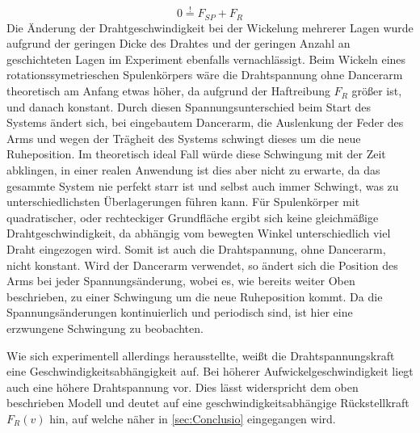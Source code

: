 \begin{equation}
    0 \overset{!}{=}  F_{SP} + F_R
\end{equation}
Die Änderung der Drahtgeschwindigkeit bei der Wickelung mehrerer Lagen wurde aufgrund der geringen Dicke des Drahtes und der geringen Anzahl an geschichteten Lagen im Experiment ebenfalls vernachlässigt.
Beim Wickeln eines rotationssymetrieschen Spulenkörpers wäre die Drahtspannung ohne Dancerarm theoretisch am Anfang etwas höher, da aufgrund der Haftreibung $F_R$ größer ist, und danach konstant. Durch diesen Spannungsunterschied beim Start des Systems ändert sich, bei eingebautem Dancerarm, die Auslenkung der Feder des Arms und wegen der Trägheit des Systems schwingt dieses um die neue Ruheposition. Im theoretisch ideal Fall würde diese Schwingung mit der Zeit abklingen, in einer realen Anwendung ist dies aber nicht zu erwarte, da das gesammte System nie perfekt starr ist und selbst auch immer Schwingt, was zu unterschiedlichsten Überlagerungen führen kann.\newline
Für Spulenkörper mit quadratischer, oder rechteckiger Grundfläche ergibt sich keine gleichmäßige Drahtgeschwindigkeit, da abhängig vom bewegten Winkel unterschiedlich viel Draht eingezogen wird. Somit ist auch die Drahtspannung, ohne Dancerarm, nicht konstant. Wird der Dancerarm verwendet, so ändert sich die Position des Arms bei jeder Spannungsänderung, wobei es, wie bereits weiter Oben beschrieben, zu einer Schwingung um die neue Ruheposition kommt. Da die Spannungsänderungen kontinuierlich und periodisch sind, ist hier eine erzwungene Schwingung zu beobachten.\newline

Wie sich experimentell allerdings herausstellte, weißt die Drahtspannungskraft eine Geschwindigkeitsabhängigkeit auf. Bei höherer Aufwickelgeschwindigkeit liegt auch eine höhere Drahtspannung vor. Dies lässt widerspricht dem oben beschrieben Modell und deutet auf eine geschwindigkeitsabhängige Rückstellkraft $F_{R}(v)$ hin, auf welche näher in \autoref{sec:Conclusio} eingegangen wird.










